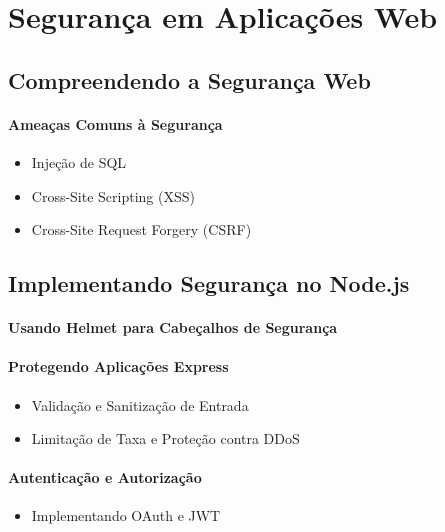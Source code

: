 
\chapter{Segurança em Aplicações Web}
\section{Compreendendo a Segurança Web}

\subsubsection{Ameaças Comuns à Segurança}
\begin{itemize}
\item Injeção de SQL
\item Cross-Site Scripting (XSS)
\item Cross-Site Request Forgery (CSRF)
\end{itemize}


\section{Implementando Segurança no Node.js}

\subsubsection{Usando Helmet para Cabeçalhos de Segurança}
\subsubsection{Protegendo Aplicações Express}
\begin{itemize}
\item Validação e Sanitização de Entrada
\item Limitação de Taxa e Proteção contra DDoS
\end{itemize}
\subsubsection{Autenticação e Autorização}
\begin{itemize}
\item Implementando OAuth e JWT
\end{itemize}















